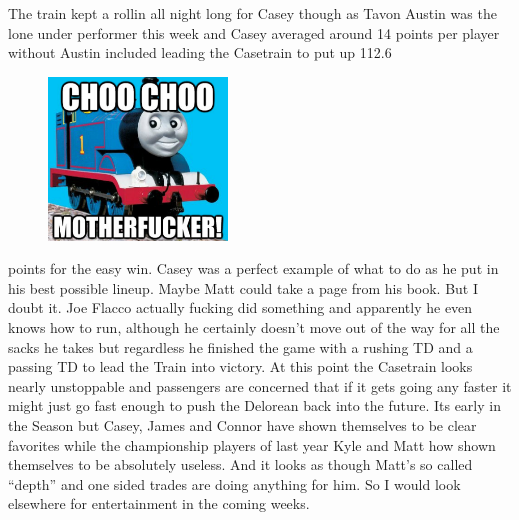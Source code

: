 \documentclass[11pt,letterpaper]{article}
\begin{document}
\bigskip
\par\noindent The train kept a rollin all night long for Casey though as Tavon Austin 
was the lone under performer this week and Casey averaged around 14 points per player without Austin included leading the Casetrain to put up 112.6 
\begin{figure}
\centering
\includegraphics[width=0.425\textwidth]{week4-choochoo.png}
\label{fig:week4-choochoo}
\end{figure} 
\par\noindent points for the easy win. Casey was a perfect example of what to do as he put in his best possible lineup. Maybe Matt could take a page from his book. But I doubt it. Joe Flacco actually fucking did something and apparently he even knows how to run, although he certainly doesn't move out of the way for all the sacks he takes but regardless he finished the game with a rushing TD and a passing TD to lead the Train into victory. At this point the Casetrain looks nearly unstoppable and passengers are concerned that if it gets going any faster it might just go fast enough to push the Delorean back into the future. Its early in the Season but Casey, James and Connor have shown themselves to be clear favorites while the championship players of last year Kyle and Matt how shown themselves to be absolutely useless. And it looks as though Matt's so called ``depth'' and one sided trades are doing anything for him. So I would look elsewhere for entertainment in the coming weeks.
\end{document}
